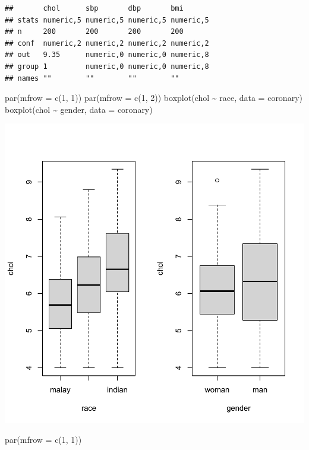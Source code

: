 \documentclass[
]{book}
\makeatletter
\newenvironment{Shaded}{\begin{snugshade}}{\end{snugshade}}
\newcommand{\AttributeTok}[1]{\textcolor[rgb]{0.61,0.61,0.61}{#1}}
\newcommand{\DecValTok}[1]{\textcolor[rgb]{0.06,0.06,0.06}{#1}}
\newcommand{\FunctionTok}[1]{\textcolor[rgb]{0,0,0}{#1}}
\newcommand{\NormalTok}[1]{#1}
\newcommand{\SpecialCharTok}[1]{\textcolor[rgb]{0,0,0}{#1}}
\newenvironment{kframe}{%
\medskip{}
\setlength{\fboxsep}{.8em}
 \def\at@end@of@kframe{}%
 \ifinner\ifhmode%
  \def\at@end@of@kframe{\end{minipage}}%
  \begin{minipage}{\columnwidth}%
 \fi\fi%
 \def\FrameCommand##1{\hskip\@totalleftmargin \hskip-\fboxsep
 \colorbox{shadecolor}{##1}\hskip-\fboxsep
     \hskip-\linewidth \hskip-\@totalleftmargin \hskip\columnwidth}%
 \MakeFramed {\advance\hsize-\width
   \@totalleftmargin\z@ \linewidth\hsize
   \@setminipage}}%
 {\par\unskip\endMakeFramed%
 \at@end@of@kframe}
\renewenvironment{Shaded}{\begin{kframe}}{\end{kframe}}
\makeatother
\begin{document}
\begin{verbatim}
##       chol      sbp       dbp       bmi      
## stats numeric,5 numeric,5 numeric,5 numeric,5
## n     200       200       200       200      
## conf  numeric,2 numeric,2 numeric,2 numeric,2
## out   9.35      numeric,0 numeric,0 numeric,8
## group 1         numeric,0 numeric,0 numeric,8
## names ""        ""        ""        ""
\end{verbatim}

\begin{Shaded}
\begin{Highlighting}[]
\FunctionTok{par}\NormalTok{(}\AttributeTok{mfrow =} \FunctionTok{c}\NormalTok{(}\DecValTok{1}\NormalTok{, }\DecValTok{1}\NormalTok{))}
\FunctionTok{par}\NormalTok{(}\AttributeTok{mfrow =} \FunctionTok{c}\NormalTok{(}\DecValTok{1}\NormalTok{, }\DecValTok{2}\NormalTok{))}
\FunctionTok{boxplot}\NormalTok{(chol }\SpecialCharTok{\textasciitilde{}}\NormalTok{ race, }\AttributeTok{data =}\NormalTok{ coronary)}
\FunctionTok{boxplot}\NormalTok{(chol }\SpecialCharTok{\textasciitilde{}}\NormalTok{ gender, }\AttributeTok{data =}\NormalTok{ coronary)}
\end{Highlighting}
\end{Shaded}

\begin{center}\includegraphics[width=0.7\linewidth,keepaspectratio]{Multivariable_Data_Analysis_files/figure-latex/unnamed-chunk-109-4} \end{center}

\begin{Shaded}
\begin{Highlighting}[]
\FunctionTok{par}\NormalTok{(}\AttributeTok{mfrow =} \FunctionTok{c}\NormalTok{(}\DecValTok{1}\NormalTok{, }\DecValTok{1}\NormalTok{))}
\end{Highlighting}
\end{Shaded}
\end{document}
